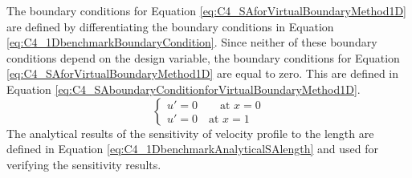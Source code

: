 %
The boundary conditions for Equation \eqref{eq:C4_SAforVirtualBoundaryMethod1D} are defined by differentiating the boundary conditions in Equation \eqref{eq:C4_1DbenchmarkBoundaryCondition}. Since neither of these boundary conditions depend on the design variable, the boundary conditions for Equation \eqref{eq:C4_SAforVirtualBoundaryMethod1D} are equal to zero. This are defined in Equation \eqref{eq:C4_SAboundaryConditionforVirtualBoundaryMethod1D}.
%
\begin{equation}\label{eq:C4_SAboundaryConditionforVirtualBoundaryMethod1D}
\begin{cases}
    u' = 0 \qquad \text{at } x = 0 \\
    u' = 0 \quad \text{at } x = 1
\end{cases}
\end{equation}
%
The analytical results of the sensitivity of velocity profile to the length are defined in Equation \eqref{eq:C4_1DbenchmarkAnalyticalSAlength} and used for verifying the sensitivity results.


